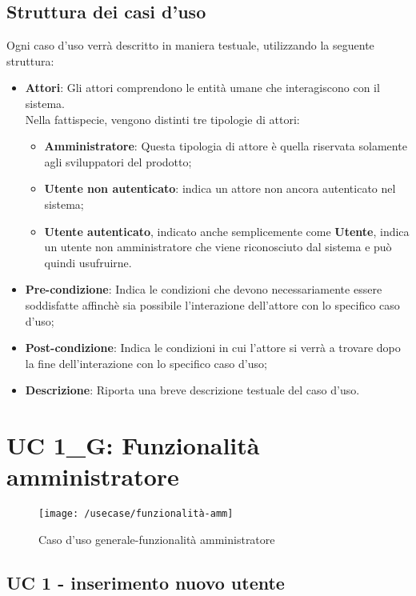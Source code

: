 \subsection{Struttura dei casi d'uso}
Ogni caso d'uso verrà descritto in maniera testuale, utilizzando la seguente struttura:
\begin{itemize}
	\item \textbf{Attori}: Gli attori comprendono le entità umane che interagiscono con il sistema. \\ 
	Nella fattispecie, vengono distinti tre tipologie di attori:
	\begin{itemize}
		\item \textbf{Amministratore}: Questa tipologia di attore è quella riservata solamente agli sviluppatori del prodotto;
		\item \textbf{Utente non autenticato}: indica un attore non ancora autenticato nel sistema;
		\item \textbf{Utente autenticato}, indicato anche semplicemente come \textbf{Utente}, indica un utente non amministratore che viene riconosciuto dal sistema e può quindi usufruirne.
	\end{itemize}
	\item \textbf{Pre-condizione}: Indica le condizioni che devono necessariamente essere soddisfatte affinchè sia possibile l'interazione dell'attore con lo specifico caso d'uso;
	\item \textbf{Post-condizione}: Indica le condizioni in cui l'attore si verrà a trovare dopo la fine dell'interazione con lo specifico caso d'uso;
	\item \textbf{Descrizione}: Riporta una breve descrizione testuale del caso d'uso.
\end{itemize}

\newpage

\section{UC 1\_G: Funzionalità amministratore}
\begin{figure}[h]
	\centering
	\texttt{[image: /usecase/funzionalità-amm]}
	\caption{Caso d'uso generale-funzionalità amministratore}
\end{figure}

\subsection{UC 1 - inserimento nuovo utente}

